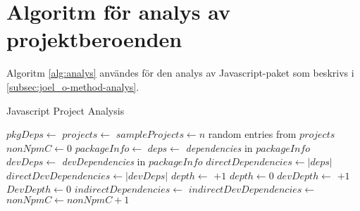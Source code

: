 \chapter{Algoritm för analys av projektberoenden}
\label{app:algorithm}

Algoritm \ref{alg:analys} användes för den analys av Javascript-paket som beskrivs i \ref{subsec:joel_o-method-analys}.

\begin{algorithm}[H]
\caption{Javascript Project Analysis} \label{alg:analys}
\begin{algorithmic}[1]
      \State \Return
    \EndIf
    \State
    \State $pkgDeps \gets$ 
    \State {}
    \State
      \State {}
    \EndFor
  \EndFunction
  \State
    \State $projects \gets $ 
    \State $sampleProjects \gets n$ random entries from $projects$
    \State
    \State $nonNpmC \gets 0$
        \State $packageInfo \gets $ 
        \State $deps \gets $ \textit{dependencies} in $packageInfo$
        \State $devDeps \gets $ \textit{devDependencies} in $packageInfo$
        \State
        \State {}
        \State
        \State $directDependencies \gets |deps|$
        \State $directDevDependencies \gets |devDeps|$
        \State
            \State{}
          \EndFor
          \State
          \State $depth \gets$  $+ 1$
        \Else
          \State $depth \gets 0$
        \EndIf
        \State
            \State {}
          \EndFor
          \State
          \State $devDepth \gets$  $+ 1$
        \Else
          \State $DevDepth \gets 0$
        \EndIf
        \State
        \State $indirectDependencies \gets$ 
        \State $indirectDevDependencies \gets$ 
        \State {}
      \Else
        \State $nonNpmC \gets nonNpmC + 1$
      \EndIf
    \EndFor
  \EndFunction
\end{algorithmic}
\end{algorithm}

